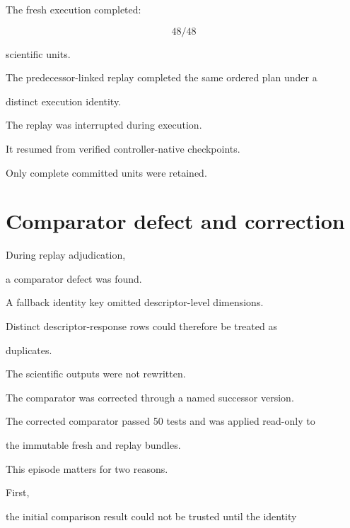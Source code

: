 \documentclass[11pt,a4paper,oneside]{report}
\begin{document}
The fresh execution completed:



\begin{equation}
48/48
\end{equation}



scientific units.



The predecessor-linked replay completed the same ordered plan under a

distinct execution identity.



The replay was interrupted during execution.



It resumed from verified controller-native checkpoints.



Only complete committed units were retained.





\section{Comparator defect and correction}



During replay adjudication,

a comparator defect was found.



A fallback identity key omitted descriptor-level dimensions.



Distinct descriptor-response rows could therefore be treated as

duplicates.



The scientific outputs were not rewritten.



The comparator was corrected through a named successor version.



The corrected comparator passed 50 tests and was applied read-only to

the immutable fresh and replay bundles.



This episode matters for two reasons.



First,

the initial comparison result could not be trusted until the identity
\end{document}
